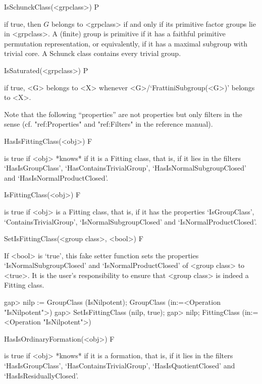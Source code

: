 \> IsSchunckClass(<grpclass>) P

if true, then $G$ belongs to <grpclass> if and only if its primitive
factor groups lie in <grpclass>. A (finite) group is primitive if it has a
faithful primitive permutation representation, or equivalently, if it has a
maximal subgroup with trivial core. A Schunck class contains every trivial
group. 

\>IsSaturated(<grpclass>) P

if true, <G> belongs to <X> whenever <G>/`FrattiniSubgroup(<G>)' belongs to
<X>.


\null


Note that the following ``properties'' are not properties but only filters in
the {\GAP} sense (cf. "ref:Properties" and "ref:Filters" in the {\GAP}
reference manual).

\>HasIsFittingClass(<obj>) F

is true if <obj> *knows* if it is a Fitting class, that is, if it lies in the
filters  `HasIsGroupClass', `HasContainsTrivialGroup',
`HasIsNormalSubgroupClosed'  and `HasIsNormalProductClosed'.

\>IsFittingClass(<obj>) F

is true if <obj> is a Fitting class, that is, if it has the properties
`IsGroupClass', `ContainsTrivialGroup', `IsNormalSubgroupClosed' and
`IsNormalProductClosed'.

\>SetIsFittingClass(<group class>, <bool>) F

If <bool> is `true', this fake setter function sets the properties
`IsNormalSubgroupClosed' and `IsNormalProductClosed' of <group class> to
<true>. It is the user's responsibility  to ensure that <group class> is
indeed a Fitting class.

\beginexample
gap> nilp := GroupClass (IsNilpotent);
GroupClass (in:=<Operation "IsNilpotent">)
gap> SetIsFittingClass (nilp, true);
gap> nilp;
FittingClass (in:=<Operation "IsNilpotent">)
\endexample

\>HasIsOrdinaryFormation(<obj>) F

%
is true if <obj> *knows* if it is a formation, that is, if it lies in the filters
`HasIsGroupClass', `HasContainsTrivialGroup', `HasIsQuotientClosed' and 
`HasIsResiduallyClosed'.

